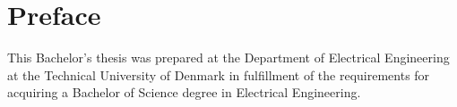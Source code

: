 \chapter{Preface}
This Bachelor's thesis was prepared at the Department of Electrical Engineering at the Technical University of Denmark in fulfillment of the requirements for acquiring a Bachelor of Science degree in Electrical Engineering.


\vfill

\iffalse
{
\centering
    \thesislocation{}, \today\\[1cm]
\begin{flushright}
    \thesisauthor{}
\end{flushright}
}
\fi